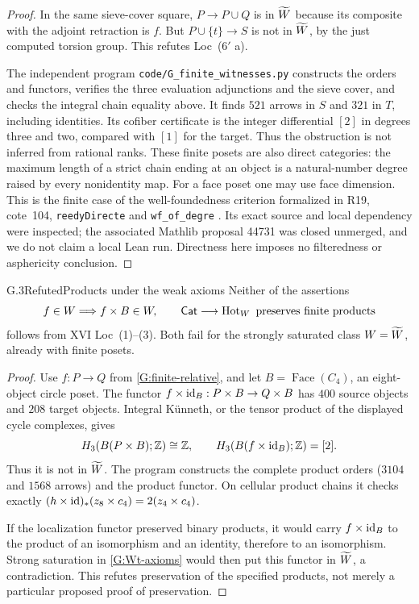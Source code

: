 \begin{proof}
In the same sieve-cover square, $P\to P\cup Q$ is in $\widetilde W$ because
its composite with the adjoint retraction is $f$.  But
$P\cup\{t\}\to S$ is not in $\widetilde W$, by the just computed torsion
group.  This refutes Loc~($6'$ a).

The independent program \texttt{code/G\_finite\_witnesses.py} constructs
the orders and functors, verifies the three evaluation adjunctions and
the sieve cover, and checks the integral chain equality above.  It
finds $521$ arrows in $S$ and $321$ in $T$, including identities.
Its cofiber certificate is the integer differential $[2]$ in degrees
three and two, compared with $[1]$ for the target.  Thus the obstruction
is not inferred from rational ranks.
These finite posets are also direct categories: the maximum length
of a strict chain ending at an object is a natural-number degree
raised by every nonidentity map. For a face poset one may use face
dimension. This is the finite case of the well-foundedness criterion
formalized in R19, cote~104, \texttt{reedyDirecte} and
\texttt{wf\_of\_degre} \cite{FR19Hua104}. Its exact source and
local dependency were inspected; the associated Mathlib proposal
44731 was closed unmerged, and we do not claim a local Lean run.
Directness here imposes no filteredness or asphericity conclusion.
\end{proof}

\begin{claim}{G.3}{Refuted}{Products under the weak axioms}
\label{G:products-fail}
Neither of the assertions
\[
 f\in W\Longrightarrow f\times B\in W,
 \qquad \mathsf{Cat}\longrightarrow\operatorname{Hot}_W\text{ preserves finite products}
\]
follows from XVI Loc~(1)--(3).  Both fail for the strongly saturated
class $W=\widetilde W$, already with finite posets.
\end{claim}
\begin{proof}
Use $f:P\to Q$ from \ref{G:finite-relative}, and let
$B=\operatorname{Face}(C_4)$, an eight-object circle poset.  The functor
$f\times\mathrm{id}_B:P\times B\to Q\times B$ has $400$ source objects
and $208$ target objects.  Integral K\"unneth, or the tensor product of
the displayed cycle complexes, gives
\[
 H_3(B(P\times B);\mathbb Z)\cong\mathbb Z,
 \qquad H_3(B(f\times\mathrm{id}_B);\mathbb Z)=[2].
\]
Thus it is not in $\widetilde W$.  The program constructs the complete product
orders ($3104$ and $1568$ arrows) and the product functor.  On cellular
product chains it checks exactly
$(h\times\mathrm{id})_*(z_8\times c_4)=2(z_4\times c_4)$.

If the localization functor preserved binary products, it would carry
$f\times\mathrm{id}_B$ to the product of an isomorphism and an identity,
therefore to an isomorphism.  Strong saturation in
\ref{G:Wt-axioms} would then put this functor in $\widetilde W$, a contradiction.
This refutes preservation of the specified products, not merely a
particular proposed proof of preservation.
\end{proof}

